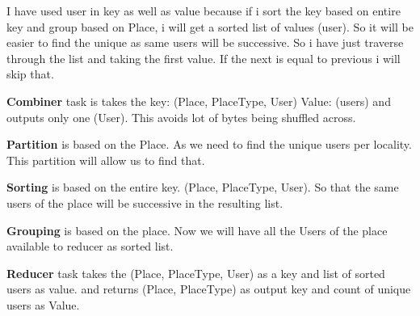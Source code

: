 	 I have used user in key as well as value because if i sort the key based on entire key and group based on Place, i will get a sorted list of values (user). So it will be easier to find the unique as same users will be successive. So i have just traverse through the list and taking the first value. If the next is equal to previous i will skip that. 
	
	\textbf{Combiner} task is takes the key: (Place, PlaceType, User) Value: (users) and outputs only one (User). This avoids lot of bytes being shuffled across. 
	
	\textbf{Partition} is based on the Place. As we need to find the unique users per locality. This partition will allow us to find that. 
	
	\textbf{Sorting} is based on the entire key. (Place, PlaceType, User). So that the same users of the place will be successive in the resulting list. 
	
	\textbf{Grouping} is based on the place. Now we will have all the Users of the place available to reducer as sorted list. 
	
	\textbf{Reducer} task takes the (Place, PlaceType, User) as a key and list of sorted users as value. and returns (Place, PlaceType) as output key and count of unique users as Value.
	
